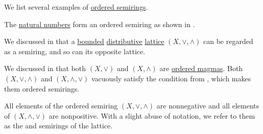 \begin{example}\label{ex:def:ordered_semiring}
  We list several examples of \hyperref[def:ordered_semirings]{ordered semirings}.

  \begin{thmenum}
     The \hyperref[def:set_of_natural_numbers]{natural numbers} form an ordered semiring as shown in .

     We discussed in  that a \hyperref[def:semilattice/bounded]{bounded} \hyperref[def:semilattice/distributive_lattice]{distributive} \hyperref[def:semilattice/lattice]{lattice} \( (X, \vee, \wedge) \) can be regarded as a semiring, and so can its opposite lattice.

    We discussed in  that both \( (X, \vee) \) and \( (X, \wedge) \) are \hyperref[def:ordered_magma]{ordered magmas}. Both \( (X, \vee, \wedge) \) and \( (X, \wedge, \vee) \) vacuously satisfy the condition from , which makes them ordered semirings.

    All elements of the ordered semiring \( (X, \vee, \wedge) \) are nonnegative and all elements of \( (X, \wedge, \vee) \) are nonpositive. With a slight abuse of notation, we refer to them as the  and  semirings of the lattice.
  \end{thmenum}
\end{example}

